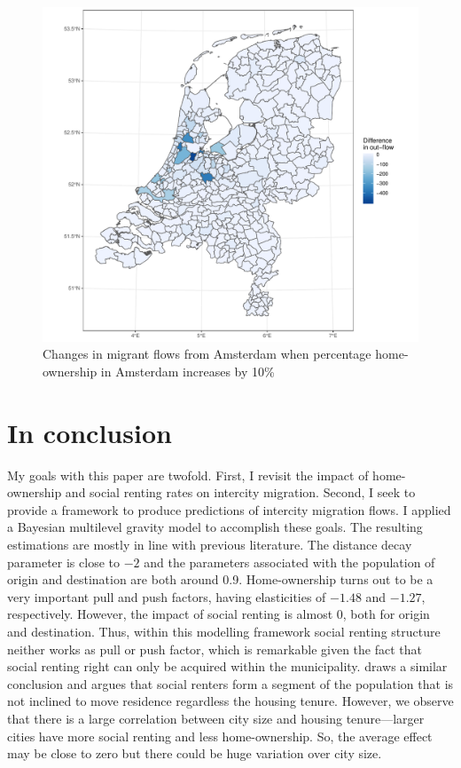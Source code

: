 \documentclass[fleqn,10pt]{SelfArx} %
\begin{document}
{{\begin{figure}
  \centering \includegraphics[width =
  \columnwidth]{../fig/p_diff_out.pdf}
  \caption{Changes in migrant flows from Amsterdam when percentage home-ownership
    in Amsterdam increases by 10\%}\label{fig:diff_out}
\end{figure}

\section{In conclusion}

My goals with this paper are twofold. First, I revisit the impact of home-ownership and social renting rates on
intercity migration. Second, I seek to provide a framework to produce predictions of intercity migration flows. 
I applied a Bayesian multilevel gravity model to accomplish these goals. The resulting estimations are mostly in line with previous literature. 
The distance decay parameter is close to $-2$ and the parameters associated with the population of origin and destination are both around 0.9.
Home-ownership turns out to be a very important pull and push factors, having elasticities of $-1.48$ and $-1.27$, respectively. However, the impact of social renting is almost 
0, both for origin and destination. Thus, within this modelling framework social renting structure neither works as pull or push factor, which is remarkable given the 
fact that social renting right can only be acquired within the municipality. \citet{boyle1998migration} draws a similar conclusion and argues that social renters form a segment of the population that is not inclined to move residence regardless the housing tenure. However, we observe that there is a large correlation between city size and housing tenure---larger cities have more social renting and less home-ownership. So, the average effect may be close to zero but there could be huge variation over city size. 

}}
\end{document}
